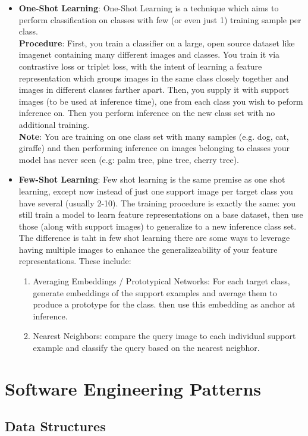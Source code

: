 \documentclass[12pt]{article}
\begin{document}
\begin{itemize}
\item \textbf{One-Shot Learning}: One-Shot Learning is a technique which aims to perform classification on classes with few (or even just 1) training sample per class. \\ 
\textbf{Procedure}: First, you train a classifier on a large, open source dataset like imagenet containing many different images and classes. You train it via contrastive loss or triplet loss, with the intent of learning a feature representation which groups images in the same class closely together and images in different classes farther apart. Then, you supply it with support images (to be used at inference time), one from each class you wish to peform inference on. Then you perform inference on the new class set with no additional training.\\
\textbf{Note}: You are training on one class set with many samples (e.g. dog, cat, giraffe) and then performing inference on images belonging to classes your model has never seen (e.g: palm tree, pine tree, cherry tree).
\item \textbf{Few-Shot Learning}: Few shot learning is the same premise as one shot learning, except now instead of just one support image per target class you have several (usually 2-10). The training procedure is exactly the same: you still train a model to learn feature representations on a base dataset, then use those (along with support images) to generalize to a new inference class set. The difference is taht in few shot learning there are some ways to leverage having multiple images to enhance the generalizeability of your feature representations. These include:
\begin{enumerate}
\item Averaging Embeddings / Prototypical Networks: For each target class, generate embeddings of the support examples and average them to produce a prototype for the class. then use this embedding as anchor at inference.
\item Nearest Neighbors: compare the query image to each individual support example and classify the query based on the nearest neigbhor.
\end{enumerate}
\end{itemize}

\section{Software Engineering Patterns}

\subsection{Data Structures}
\end{document}
